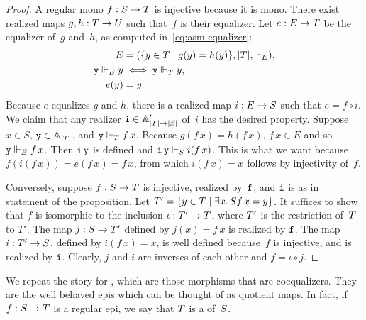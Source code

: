 \begin{proof}
  A regular mono $f : \asm{S} \to \asm{T}$ is injective because it is
  mono. There exist realized maps $g, h : \asm{T} \to \asm{U}$ such
  that~$f$ is their equalizer. Let $e : \asm{E} \to \asm{T}$ be the
  equalizer of~$g$ and~$h$, as computed in~\eqref{eq:asm-equalizer}:
  \begin{align*}
    \asm{E} &= (\set{y \in T \such g(y) = h(y)}, |T|, {\rz[E]}), \\
    \R{y} \rz[E] y &\iff \R{y} \rz[T] y, \\
    e(y) &= y.
  \end{align*}
  Because $e$ equalizes $g$ and $h$, there is a realized map $i :
  \asm{E} \to \asm{S}$ such that $e = f \circ i$. We claim that any
  realizer $\R{i} \in \subAtyp{|T| \to |S|}$ of~$i$ has the desired
  property. Suppose $x \in S$, $\R{y} \in \Atyp{|T|}$, and $\R{y}
  \rz[T] f\,x$. Because $g(f\,x) = h(f\,x)$, $f\,x \in E$ and so $\R{y}
  \rz[E] f\,x$. Then $\R{i}\,\R{y}$ is defined and $\R{i}\,\R{y} \rz[S]
  i(f\,x)$. This is what we want because $f(i(f\,x)) = e(f\,x) =
  f\,x$, from which $i(f\,x) = x$ follows by injectivity of~$f$.

  Conversely, suppose $f : \asm{S} \to \asm{T}$ is injective, realized
  by~$\R{f}$, and $\R{i}$ is as in statement of the proposition. Let
  $T' = \set{y \in T \such \some{x}{S}{f\,x = y}}$. It suffices to
  show that $f$ is isomorphic to the inclusion $\iota : \asm{T}' \to
  \asm{T}$, where $\asm{T}'$ is the restriction of~$\asm{T}$ to $T'$.
  The map $j : \asm{S} \to \asm{T}'$ defined by $j(x) = f\,x$ is
  realized by $\R{f}$. The map $i : \asm{T}' \to \asm{S}$, defined by
  $i(f\,x) = x$, is well defined because~$f$ is injective, and is
  realized by $\R{i}$. Clearly, $j$ and $i$ are inverses of each other
  and $f = \iota \circ j$.
\end{proof}


We repeat the story for , which are those morphisms
that are coequalizers. They are the well behaved epis which can be
thought of as quotient maps. In fact, if $f : \asm{S} \to \asm{T}$ is
a regular epi, we say that $\asm{T}$ is a  of~$\asm{S}$.

